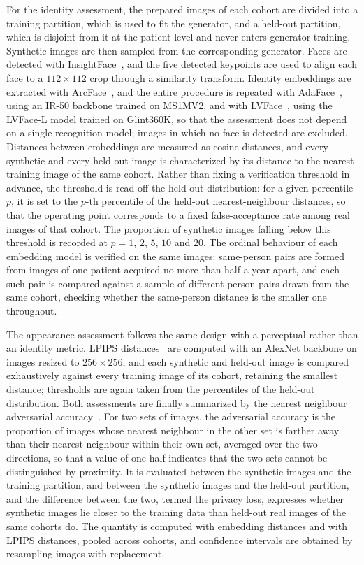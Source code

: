 \documentclass[11pt]{article}
\begin{document}
For the identity assessment, the prepared images of each cohort are divided into
a training partition, which is used to fit the generator, and a held-out
partition, which is disjoint from it at the patient level and never enters
generator training. Synthetic images are then sampled from the corresponding
generator. Faces are detected with InsightFace~\cite{insightface}, and the five
detected keypoints are used to align each face to a $112\times112$ crop through
a similarity transform. Identity embeddings are extracted with
ArcFace~\cite{arcface}, and the entire procedure is repeated with
AdaFace~\cite{adaface}, using an IR-50 backbone trained on MS1MV2, and with
LVFace~\cite{lvface}, using the LVFace-L model trained on Glint360K, so that the
assessment does not depend on a single recognition model; images in which no
face is detected are excluded. Distances between embeddings are measured as
cosine distances, and every synthetic and every held-out image is characterized
by its distance to the nearest training image of the same cohort. Rather than
fixing a verification threshold in advance, the threshold is read off the
held-out distribution: for a given percentile $p$, it is set to the $p$-th
percentile of the held-out nearest-neighbour distances, so that the operating
point corresponds to a fixed false-acceptance rate among real images of that
cohort. The proportion of synthetic images falling below this threshold is
recorded at $p = 1$, $2$, $5$, $10$ and $20$. The ordinal behaviour of each
embedding model is verified on the same images: same-person pairs are formed
from images of one patient acquired no more than half a year apart, and each
such pair is compared against a sample of different-person pairs drawn from the
same cohort, checking whether the same-person distance is the smaller one
throughout.

The appearance assessment follows the same design with a perceptual rather than
an identity metric. LPIPS distances~\cite{lpips} are computed with an AlexNet
backbone on images resized to $256\times256$, and each synthetic and held-out
image is compared exhaustively against every training image of its cohort,
retaining the smallest distance; thresholds are again taken from the percentiles
of the held-out distribution. Both assessments are finally summarized by the
nearest neighbour adversarial accuracy~\cite{nnaa}. For two sets of images, the
adversarial accuracy is the proportion of images whose nearest neighbour in the
other set is farther away than their nearest neighbour within their own set,
averaged over the two directions, so that a value of one half indicates that the
two sets cannot be distinguished by proximity. It is evaluated between the
synthetic images and the training partition, and between the synthetic images
and the held-out partition, and the difference between the two, termed the
privacy loss, expresses whether synthetic images lie closer to the training data
than held-out real images of the same cohorts do. The quantity is computed with
embedding distances and with LPIPS distances, pooled across cohorts, and
confidence intervals are obtained by resampling images with replacement.
\end{document}
